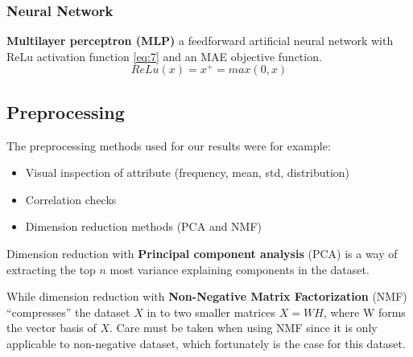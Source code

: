 \documentclass[a4paper]{article}
\begin{document}
\subsubsection{Neural Network}
\textbf{Multilayer perceptron (MLP)} a feedforward artificial neural network with ReLu activation function \ref{eq:7} and an MAE objective function.
\begin{equation} \label{eq:7}
ReLu(x) = x^+ = max(0, x)
\end{equation}

\subsection{Preprocessing}
The preprocessing methods used for our results were for example:
\begin{itemize}
    \item Visual inspection of attribute (frequency, mean, std, distribution)
    \item Correlation checks
    \item Dimension reduction methods (PCA and NMF)
\end{itemize}
Dimension reduction with \textbf{Principal component analysis} (PCA) is a way of extracting the top $n$ most variance explaining components in the dataset.

While dimension reduction with \textbf{Non-Negative Matrix Factorization} (NMF) “compresses” the dataset $X$ in to two smaller matrices $X=WH$, where W forms the vector basis of $X$. Care must be taken when using NMF since it is only applicable to non-negative dataset, which fortunately is the case for this dataset.


%
\end{document}
